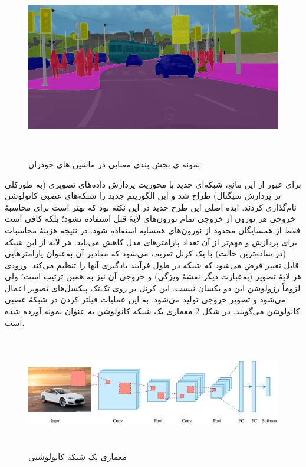 \begin{figure}[H]
  \centering
  \includegraphics[height=8cm,width=12cm]{CNN/Zurich-Cityscapes.png}
  \caption[نمونه ی بخش بندی معنایی در ماشین های خودران]{ نمونه ی بخش بندی معنایی در ماشین های خودران\cite{ref7}}
  \label{CNN2}
  \centering
\end{figure}

برای عبور از این مانع، شبکه‌ای جدید با محوریت پردازش داده‌های تصویری (به‌ طورکلی تر پردازش سیگنال) طراح شد و این الگوریتم جدید را شبکه‌های عصبی کانولوشن نام‌گذاری کردند. ایده اصلی این طرح جدید در این نکته بود که بهتر است برای محاسبهٔ خروجی هر نورون از خروجی تمام نورون‌های لایهٔ قبل استفاده نشود؛ بلکه کافی است فقط از همسایگان محدود از نورون‌های همسایه استفاده شود. در نتیجه هزینهٔ محاسبات برای پردازش و مهم‌تر از آن تعداد پارامترهای مدل کاهش می‌یابد. هر لایه از این شبکه (در ساده‌ترین حالت) با یک کرنل تعریف می‌شود که مقادیر آن به‌عنوان پارامترهایی قابل تغییر فرض می‌شود که شبکه در طول فرآیند یادگیری آنها را تنظیم می‌کند. ورودی هر لایهٔ تصویر (به‌عبارت ‌دیگر نقشهٔ ویژگی) و خروجی آن نیز به همین ترتیب است؛ ولی لزوماً رزولوشن این دو یکسان نیست. این کرنل بر روی تک‌تک پیکسل‌های تصویر اعمال می‌شود و تصویر خروجی تولید می‌شود. به این عملیات فیلتر کردن در شبکهٔ عصبی کانولوشن می‌گویند. در شکل \ref{CNN} معماری یک شبکه کانولوشن به عنوان نمونه آورده شده است.

\begin{figure}[H]
  \centering
  \includegraphics[height=5cm,width=15cm]{CNN/183560_qcMBDPuKpDvICcdd.png}
  \caption{ معماری یک شبکه کانولوشنی}
  \label{CNN}
  \centering
\end{figure}

